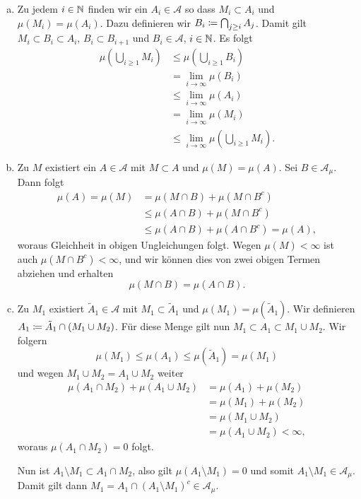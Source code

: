 \documentclass[a4paper,twoside,DIV15,BCOR12mm]{scrbook}
\newcommand{\A}{\mathcal A}
\begin{document}
\begin{beweis}

\begin{enumerate}[a)]
\item Zu jedem $i\in\mathbb{N}$ finden wir ein $A_i\in \A$ so dass $M_i\subset A_i$ und $\mu(M_i) =\mu(A_i)$. Dazu definieren wir $B_i \da \bigcap_{j\ge i} A_j$. Damit gilt $M_i \subset B_i\subset A_i$, $B_i\subset B_{i+1}$ und $B_i\in\A$, $i\in\mathbb{N}$. Es folgt
\begin{align*}
\mu(\bigcup_{i\ge 1} M_i) &\le \mu(\bigcup_{i\ge1}B_i) \\
&= \lim_{i\to\infty} \mu(B_i) \\
&\le \lim_{i\to\infty} \mu(A_i) \\
&= \lim_{i\to\infty} \mu(M_i) \\
&\le \lim_{i\to\infty} \mu(\bigcup_{i\ge 1} M_i).
\end{align*}
\item  Zu $M$ existiert ein $A\in\A$ mit $M\subset A$ und $\mu(M) = \mu(A)$. Sei $B\in \A_\mu$. Dann folgt
\begin{align*}
\mu(A) = \mu(M) &= \mu(M\cap B) + \mu(M\cap B^c) \\
&\le \mu(A\cap B) + \mu(M \cap B^c) \\
&\le \mu(A\cap B) + \mu(A \cap B^c) = \mu(A),
\end{align*}
woraus Gleichheit in obigen Ungleichungen folgt. Wegen $\mu(M)<\infty$ ist auch $\mu(M\cap B^c)<\infty$, und wir können dies von zwei obigen Termen abziehen und erhalten
\[
\mu(M\cap B) = \mu(A\cap B).
\]
\item  Zu $M_1$ existiert $\tilde A_1\in\A$ mit $M_1 \subset \tilde A_1$ und $\mu(M_1) = \mu(\tilde A_1)$. Wir definieren $A_1 \da \tilde A_1 \cap (M_1\cup M_2)$. Für diese Menge gilt nun $M_1\subset A_1 \subset M_1\cup M_2$. Wir folgern 
\[
\mu(M_1) \le \mu(A_1) \le \mu (\tilde A_1) = \mu(M_1)
\]
und wegen $M_1\cup M_2 = A_1\cup M_2$ weiter
\begin{align*}
\mu(A_1\cap M_2) + \mu(A_1 \cup M_2) &= \mu(A_1) + \mu(M_2) \\
&= \mu(M_1) + \mu(M_2) \\
&= \mu(M_1\cup M_2) \\
&= \mu(A_1 \cup M_2) < \infty,
\end{align*}
woraus $\mu(A_1\cap M_2) = 0$ folgt.

Nun ist $A_1\setminus M_1\subset A_1\cap M_2$, also gilt $\mu(A_1\setminus M_1) = 0$ und somit $A_1\setminus M_1\in \A_\mu$. Damit gilt dann $M_1 = A_1\cap (A_1\setminus M_1)^c\in \A_\mu$.
\end{enumerate}

\end{beweis}
\end{document}
